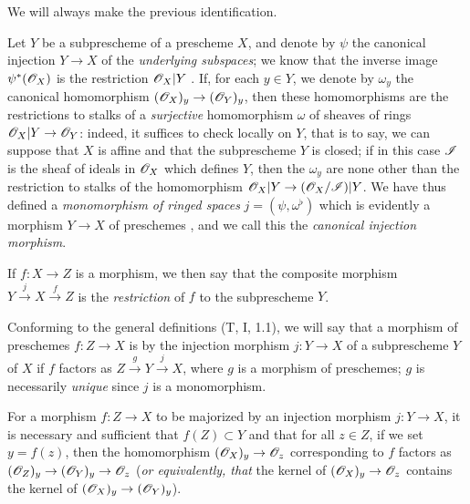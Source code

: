 We will always make the previous identification.
\begin{env}[4.1.7]
\label{1.4.1.7}
Let $Y$ be a subprescheme of a prescheme $X$, and denote by $\psi$ the canonical injection $Y\to X$ of the \emph{underlying subspaces}; we know that the inverse image $\psi^*(\mathscr{O}_X)$ is the restriction $\mathscr{O}_X|Y$ .
If, for each $y\in Y$, we denote by $\omega_y$ the canonical homomorphism $(\mathscr{O}_X)_y\to(\mathscr{O}_Y)_y$, then these homomorphisms are the restrictions to stalks of a \emph{surjective} homomorphism $\omega$ of sheaves of rings $\mathscr{O}_X|Y\to\mathscr{O}_Y$: indeed, it suffices to check locally on $Y$, that is to say, we can suppose that $X$ is affine and that the subprescheme $Y$ is closed; if in this case $\mathscr{I}$ is the sheaf of ideals in $\mathscr{O}_X$ which defines $Y$, then the $\omega_y$ are none other than the restriction to stalks of the homomorphism $\mathscr{O}_X|Y\to(\mathscr{O}_X/\mathscr{I})|Y$.
We have thus defined a \emph{monomorphism of ringed spaces}  $j=(\psi,\omega^\flat)$ which is evidently a morphism $Y\to X$ of preschemes , and we call this the \emph{canonical injection morphism}.

If $f:X\to Z$ is a morphism, we then say that the composite morphism $Y\xrightarrow{j}X\xrightarrow{f}Z$ is the \emph{restriction} of $f$ to the subprescheme $Y$.
\end{env}

\begin{env}[4.1.8]
\label{1.4.1.8}
Conforming to the general definitions (T, I, 1.1), we will say that a morphism of preschemes $f:Z\to X$ is  by the injection morphism $j:Y\to X$ of a subprescheme $Y$ of $X$ if $f$ factors as $Z\xrightarrow{g}Y\xrightarrow{j}X$, where $g$ is a morphism of preschemes; $g$ is necessarily \emph{unique} since $j$ is a monomorphism.
\end{env}

\begin{prop}[4.1.9]
\label{1.4.1.9}
For a morphism $f:Z\to X$ to be majorized by an injection morphism $j:Y\to X$, it is necessary and sufficient that $f(Z)\subset Y$ and that for all $z\in Z$, if we set $y=f(z)$, then the homomorphism $(\mathscr{O}_X)_y\to\mathscr{O}_z$ corresponding to $f$ factors as $(\mathscr{O}_Z)_y\to(\mathscr{O}_Y)_y\to\mathscr{O}_z$ (\emph{or equivalently, that} the kernel of $(\mathscr{O}_X)_y\to\mathscr{O}_z$ contains the kernel of $(\mathscr{O}_X)_y\to(\mathscr{O}_Y)_y$).
\end{prop}

